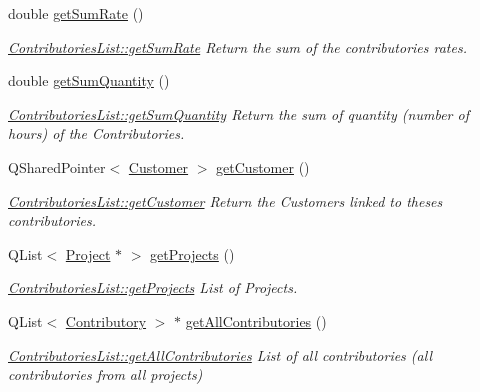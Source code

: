 \begin{DoxyCompactItemize}
double \hyperlink{classModels_1_1ContributoriesList_ae2fd3ad53b082ee8adf3d0249e4f539b}{get\-Sum\-Rate} ()
\begin{DoxyCompactList}\small\item\em \hyperlink{classModels_1_1ContributoriesList_ae2fd3ad53b082ee8adf3d0249e4f539b}{Contributories\-List\-::get\-Sum\-Rate} Return the sum of the contributories rates. \end{DoxyCompactList}\item 
double \hyperlink{classModels_1_1ContributoriesList_af9b3b1b703cebeef552d058999ffcc4c}{get\-Sum\-Quantity} ()
\begin{DoxyCompactList}\small\item\em \hyperlink{classModels_1_1ContributoriesList_af9b3b1b703cebeef552d058999ffcc4c}{Contributories\-List\-::get\-Sum\-Quantity} Return the sum of quantity (number of hours) of the Contributories. \end{DoxyCompactList}\item 
Q\-Shared\-Pointer$<$ \hyperlink{classModels_1_1Customer}{Customer} $>$ \hyperlink{classModels_1_1ContributoriesList_a760097b1c0d7822cfd3d4796d553fae9}{get\-Customer} ()
\begin{DoxyCompactList}\small\item\em \hyperlink{classModels_1_1ContributoriesList_a760097b1c0d7822cfd3d4796d553fae9}{Contributories\-List\-::get\-Customer} Return the Customers linked to theses contributories. \end{DoxyCompactList}\item 
Q\-List$<$ \hyperlink{classModels_1_1Project}{Project} $\ast$ $>$ \hyperlink{classModels_1_1ContributoriesList_a4d52a35870cd9257ee3b5db75bd8ff25}{get\-Projects} ()
\begin{DoxyCompactList}\small\item\em \hyperlink{classModels_1_1ContributoriesList_a4d52a35870cd9257ee3b5db75bd8ff25}{Contributories\-List\-::get\-Projects} List of Projects. \end{DoxyCompactList}\item 
Q\-List$<$ \hyperlink{classModels_1_1Contributory}{Contributory} $>$ $\ast$ \hyperlink{classModels_1_1ContributoriesList_a629a25a7958dba28ec37c8a3709cdf2f}{get\-All\-Contributories} ()
\begin{DoxyCompactList}\small\item\em \hyperlink{classModels_1_1ContributoriesList_a629a25a7958dba28ec37c8a3709cdf2f}{Contributories\-List\-::get\-All\-Contributories} List of all contributories (all contributories from all projects) \end{DoxyCompactList}\item 

\end{DoxyCompactItemize}
